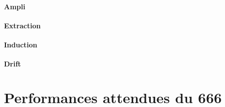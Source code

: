                 \paragraph{Ampli}
                \paragraph{Extraction}
                \paragraph{Induction}
                \paragraph{Drift}
    
    \section{Performances attendues du 666}